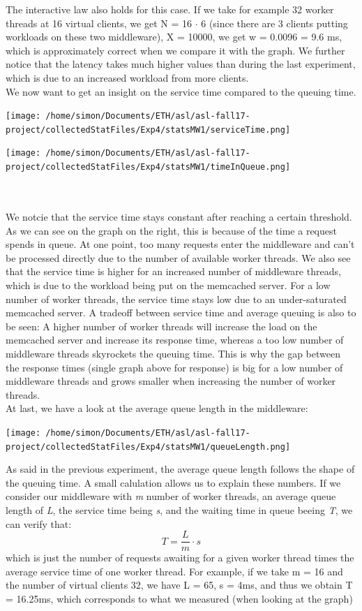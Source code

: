 \documentclass[11pt,a4paper]{article}
\begin{document}
The interactive law also holds for this case. If we take for example 32 worker threads at 16 virtual clients, we get N = 16 $\cdot$ 6 (since there are 3 clients putting workloads on these two middleware), X = 10000, we get w = 0.0096 = 9.6 ms, which is approximately correct when we compare it with the graph. 
We further notice that the latency takes much higher values than during the last experiment, which is due to an increased workload from more clients. 
\\
We now want to get an insight on the service time compared to the queuing time.
\\
\begin{minipage}{0.5\linewidth}
\texttt{[image: /home/simon/Documents/ETH/asl/asl-fall17-project/collectedStatFiles/Exp4/statsMW1/serviceTime.png]}
\end{minipage}
\hfill
\begin{minipage}{0.5\linewidth}
\texttt{[image: /home/simon/Documents/ETH/asl/asl-fall17-project/collectedStatFiles/Exp4/statsMW1/timeInQueue.png]}
\end{minipage}
\\\\
We notcie that the service time stays constant after reaching a certain threshold. As we can see on the graph on the right, this is because of the time a request spends in queue. At one point, too many requests enter the middleware and can't be processed directly due to the number of available worker threads. We also see that the service time is higher for an increased number of middleware threads, which is due to the workload being put on the memcached server. For a low number of worker threads, the service time stays low due to an under-saturated memcached server. 
A tradeoff between service time and average queuing is also to be seen: A higher number of worker threads will increase the load on the memcached server and increase its response time, whereas a too low number of middleware threads skyrockets the queuing time. This is why the gap between the response times (single graph above for response) is big for a low number of middleware threads and grows smaller when increasing the number of worker threads. 
\\
At last, we have a look at the average queue length in the middleware:
\begin{center}
\texttt{[image: /home/simon/Documents/ETH/asl/asl-fall17-project/collectedStatFiles/Exp4/statsMW1/queueLength.png]}
\end{center}
As said in the previous experiment, the average queue length follows the shape of the queuing time. A small calulation allows us to explain these numbers. 
If we consider our middleware with \textit{m} number of worker threads, an average queue length of \textit{L}, the service time being \textit{s}, and the waiting time in queue beeing \textit{T}, we can verify that: 
\[ T = \frac{L}{m}\cdot s \]
which is just the number of requests awaiting for a given worker thread times the average service time of one worker thread. For example, if we take m = 16 and the number of virtual clients 32, we have L = 65, s = 4ms, and thus we obtain T = 16.25ms, which corresponds to what we measured (when looking at the graph)
\end{document}

